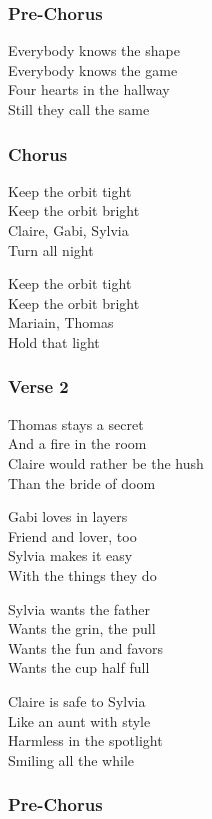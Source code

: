 \subsubsection{Pre-Chorus}\label{pre-chorus-12}

Everybody knows the shape\\
Everybody knows the game\\
Four hearts in the hallway\\
Still they call the same

\subsubsection{Chorus}\label{chorus-32}

Keep the orbit tight\\
Keep the orbit bright\\
Claire, Gabi, Sylvia\\
Turn all night

Keep the orbit tight\\
Keep the orbit bright\\
Mariain, Thomas\\
Hold that light

\subsubsection{Verse 2}\label{verse-2-11}

Thomas stays a secret\\
And a fire in the room\\
Claire would rather be the hush\\
Than the bride of doom

Gabi loves in layers\\
Friend and lover, too\\
Sylvia makes it easy\\
With the things they do

Sylvia wants the father\\
Wants the grin, the pull\\
Wants the fun and favors\\
Wants the cup half full

Claire is safe to Sylvia\\
Like an aunt with style\\
Harmless in the spotlight\\
Smiling all the while

\subsubsection{Pre-Chorus}\label{pre-chorus-13}

